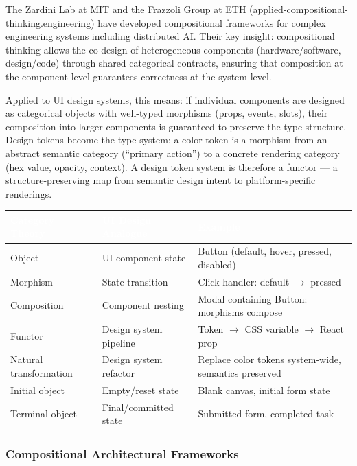 \documentclass[11pt,letterpaper]{article}
\newcommand{\tableheader}[1]{\textbf{\sffamily\textcolor{white}{#1}}}
\begin{document}
The Zardini Lab at MIT and the Frazzoli Group at ETH (applied-compositional-thinking.engineering) have developed compositional frameworks for complex engineering systems including distributed AI. Their key insight: compositional thinking allows the co-design of heterogeneous components (hardware/software, design/code) through shared categorical contracts, ensuring that composition at the component level guarantees correctness at the system level.

Applied to UI design systems, this means: if individual components are designed as categorical objects with well-typed morphisms (props, events, slots), their composition into larger components is guaranteed to preserve the type structure. Design tokens become the type system: a color token is a morphism from an abstract semantic category (``primary action'') to a concrete rendering category (hex value, opacity, context). A design token system is therefore a functor --- a structure-preserving map from semantic design intent to platform-specific renderings.

\begin{center}
\begin{tabularx}{\textwidth}{L{3.5cm}L{3.5cm}X}
\toprule
{}
\tableheader{Category Theory} & \tableheader{UI Design Analogue} & \tableheader{Example} \\
\midrule
Object & UI component state & Button (default, hover, pressed, disabled) \\
Morphism & State transition & Click handler: default $\to$ pressed \\
Composition & Component nesting & Modal containing Button: morphisms compose \\
Functor & Design system pipeline & Token $\to$ CSS variable $\to$ React prop \\
Natural transformation & Design system refactor & Replace color tokens system-wide, semantics preserved \\
Initial object & Empty/reset state & Blank canvas, initial form state \\
Terminal object & Final/committed state & Submitted form, completed task \\
\bottomrule
\end{tabularx}
\end{center}

\subsubsection{Compositional Architectural Frameworks}
\end{document}
